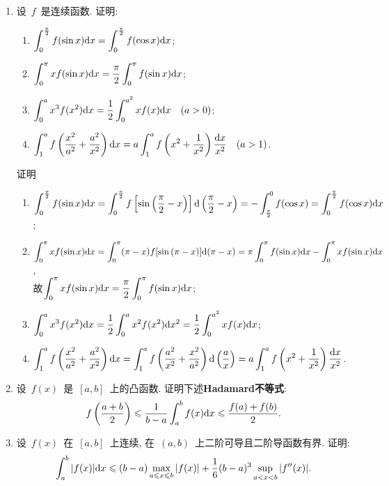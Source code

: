 \documentclass[UTF8,a4paper,20pt]{article}
\begin{document}
\begin{enumerate}
\item 设~$f$~是连续函数. 证明:
	\begin{enumerate}[(1)]
	\item $\displaystyle\int_0^{\frac{\pi}{2}} f(\sin{x})\mathrm{d}x=\int_0^{\frac{\pi}{2}} f(\cos{x})\mathrm{d}x$;
	\item $\displaystyle\int_0^{\pi} xf(\sin{x})\mathrm{d}x=\dfrac{\pi}{2}\int_0^{\pi}f(\sin{x})\mathrm{d}x$;
	\item $\displaystyle\int_0^a x^3f(x^2)\mathrm{d}x=\dfrac{1}{2}\int_0^{a^2}xf(x)\mathrm{d}x\quad (a>0)$;
	\item $\displaystyle\int_1^a f\left(\dfrac{x^2}{a^2}+\dfrac{a^2}{x^2}\right)\mathrm{d}x=a\int_1^a f\left(x^2+\dfrac{1}{x^2}\right)\dfrac{\mathrm{d}x}{x^2}\quad(a>1)$.
	\end{enumerate}
{\heiti 证明}\\
	\begin{enumerate}[(1)]
		\item $\displaystyle\int_0^{\frac{\pi}{2}} f(\sin{x})\mathrm{d}x=\int_0^{\frac{\pi}{2}} f\left[\sin{\left(\dfrac{\pi}{2}-x\right)}\right]\mathrm{d}\left(\dfrac{\pi}{2}-x\right)=-\int_{\frac{\pi}{2}}^0f(\cos{x})=\int_0^{\frac{\pi}{2}} f(\cos{x})\mathrm{d}x$;
		\item $\displaystyle\int_0^{\pi}xf(\sin{x})\mathrm{d}x=\int_0^{\pi}(\pi-x)f[\sin{(\pi-x)}]\mathrm{d}(\pi-x)=\pi\int_0^{\pi}f(\sin{x})\mathrm{d}x-\int_0^{\pi}xf(\sin{x})\mathrm{d}x$,\\
		故$\displaystyle\int_0^{\pi} xf(\sin{x})\mathrm{d}x=\dfrac{\pi}{2}\int_0^{\pi}f(\sin{x})\mathrm{d}x$;
		\item $\displaystyle\int_0^a x^3f(x^2)\mathrm{d}x=\dfrac{1}{2}\int_0^a x^2f(x^2)\mathrm{d}x^2=\dfrac{1}{2}\int_0^{a^2} xf(x)\mathrm{d}x$;
		\item $\displaystyle\int_1^a f\left(\dfrac{x^2}{a^2}+\dfrac{a^2}{x^2}\right)\mathrm{d}x=\int_1^a f\left(\dfrac{a^2}{x^2}+\dfrac{x^2}{a^2}\right)\mathrm{d}\left(\dfrac{a}{x}\right)=a\int_1^a f\left(x^2+\dfrac{1}{x^2}\right)\dfrac{\mathrm{d}x}{x^2}$.
	\end{enumerate}

\item 设~$f(x)$~是~$[a,b]$~上的凸函数. 证明下述{\bf Hadamard不等式}: 
\[f\left(\dfrac{a+b}{2}\right)\leqslant\dfrac{1}{b-a}\int_a^b f(x)\mathrm{d}x\leqslant\dfrac{f(a)+f(b)}{2}.\]

\item 设~$f(x)$~在~$[a,b]$~上连续, 在~$(a,b)$~上二阶可导且二阶导函数有界. 证明:
\[\int_a^b |f(x)|\mathrm{d}x\leqslant(b-a)\max_{a\leqslant x\leqslant b}|f(x)|+\dfrac{1}{6}(b-a)^3\sup_{a<x<b}|f''(x)|.\]


\end{enumerate}
\end{document}
